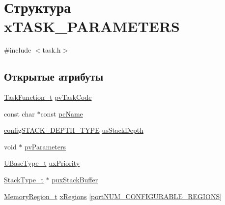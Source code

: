 \hypertarget{structx_t_a_s_k___p_a_r_a_m_e_t_e_r_s}{}\section{Структура x\+T\+A\+S\+K\+\_\+\+P\+A\+R\+A\+M\+E\+T\+E\+RS}
\label{structx_t_a_s_k___p_a_r_a_m_e_t_e_r_s}


{\ttfamily \#include $<$task.\+h$>$}

\subsection*{Открытые атрибуты}
\begin{DoxyCompactItemize}
\item 
\mbox{\hyperlink{projdefs_8h_a9b32502ff92c255c686dacde53c1cba0}{Task\+Function\+\_\+t}} \mbox{\hyperlink{structx_t_a_s_k___p_a_r_a_m_e_t_e_r_s_a7527993402054565cda38251c8922880}{pv\+Task\+Code}}
\item 
const char $\ast$const \mbox{\hyperlink{structx_t_a_s_k___p_a_r_a_m_e_t_e_r_s_a7b3e5583acf9de8bacac572a42246459}{pc\+Name}}
\item 
\mbox{\hyperlink{_free_r_t_o_s_8h_ae4e85bffd36d76cf2796092f0ccd784a}{config\+S\+T\+A\+C\+K\+\_\+\+D\+E\+P\+T\+H\+\_\+\+T\+Y\+PE}} \mbox{\hyperlink{structx_t_a_s_k___p_a_r_a_m_e_t_e_r_s_ac2edb442cd1a9dc5435c7735ed99c83e}{us\+Stack\+Depth}}
\item 
void $\ast$ \mbox{\hyperlink{structx_t_a_s_k___p_a_r_a_m_e_t_e_r_s_accbb9f4de75b5b5be750198b52390c7f}{pv\+Parameters}}
\item 
\mbox{\hyperlink{portmacro_8h_a646f89d4298e4f5afd522202b11cb2e6}{U\+Base\+Type\+\_\+t}} \mbox{\hyperlink{structx_t_a_s_k___p_a_r_a_m_e_t_e_r_s_aa1aff14035db645e2bdcc85b3cdc9bab}{ux\+Priority}}
\item 
\mbox{\hyperlink{portmacro_8h_a84e9a8ba132feed0b2401c1f4e2ac63c}{Stack\+Type\+\_\+t}} $\ast$ \mbox{\hyperlink{structx_t_a_s_k___p_a_r_a_m_e_t_e_r_s_a946c525d3765369780538f9bc3f3586d}{pux\+Stack\+Buffer}}
\item 
\mbox{\hyperlink{task_8h_af609504de4d78ff6f71477ae47c66e51}{Memory\+Region\+\_\+t}} \mbox{\hyperlink{structx_t_a_s_k___p_a_r_a_m_e_t_e_r_s_ae8b97c6b7a344bf09b066b0844844d66}{x\+Regions}} \mbox{[}\mbox{\hyperlink{portable_8h_aca7e1a8a568a38b74cc9db10c8efebda}{port\+N\+U\+M\+\_\+\+C\+O\+N\+F\+I\+G\+U\+R\+A\+B\+L\+E\+\_\+\+R\+E\+G\+I\+O\+NS}}\mbox{]}
\end{DoxyCompactItemize}


